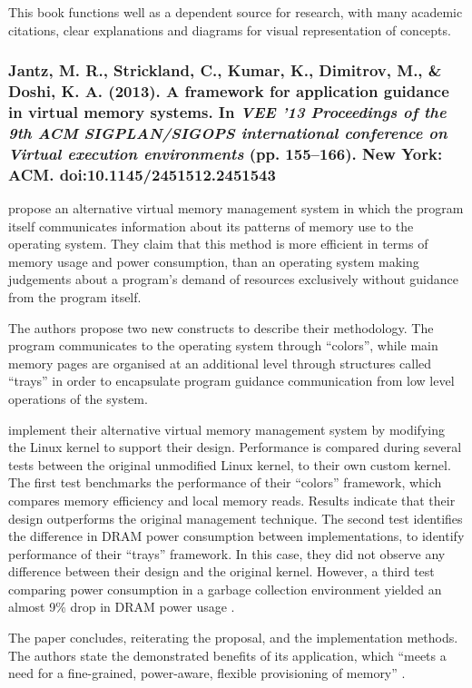 This book functions well as a dependent source for research, with many academic citations, clear explanations and diagrams for visual representation of concepts.

\subsubsection*{Jantz, M. R., Strickland, C., Kumar, K., Dimitrov, M., \& Doshi, K. A. (2013). A framework for application guidance in virtual memory systems. In \emph{VEE ’13 Proceedings of the 9th ACM SIGPLAN/SIGOPS international conference on Virtual execution environments} (pp. 155–166). New York: ACM. doi:10.1145/2451512.2451543}

\citet{Jantz2013} propose an alternative virtual memory management system in which the program itself communicates information about its patterns of memory use to the operating system. They claim that this method is more efficient in terms of memory usage and power consumption, than an operating system making judgements about a program's demand of resources exclusively without guidance from the program itself.

The authors propose two new constructs to describe their methodology. The program communicates to the operating system through ``colors'', while main memory pages are organised at an additional level through structures called ``trays'' in order to encapsulate program guidance communication from low level operations of the system.

\citet{Jantz2013} implement their alternative virtual memory management system by modifying the Linux kernel to support their design. Performance is compared during several tests between the original unmodified Linux kernel, to their own custom kernel. The first test benchmarks the performance of their ``colors'' framework, which compares memory efficiency and local memory reads. Results indicate that their design outperforms the original management technique. The second test identifies the difference in DRAM power consumption between implementations, to identify performance of their ``trays'' framework. In this case, they did not observe any difference between their design and the original kernel. However, a third test comparing power consumption in a garbage collection environment yielded an almost 9\% drop in DRAM power usage \citep[p. 164]{Jantz2013}.

The paper concludes, reiterating the proposal, and the implementation methods. The authors state the demonstrated benefits of its application, which ``meets a need for a fine-grained, power-aware, flexible provisioning of memory'' \citep[p. 164]{Jantz2013}.